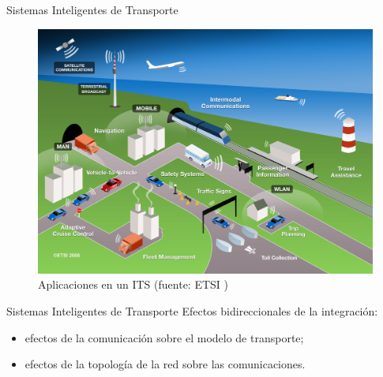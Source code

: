 \documentclass[aspectratio=169]{beamer}
\begin{document}
\begin{frame}{Sistemas Inteligentes de Transporte}
\begin{figure}
    \centering
    \includegraphics[height=0.8\textheight]{figuras/ITS.png}
    \caption{Aplicaciones en un ITS (fuente: ETSI \autocite{etsi})}
    \label{fig:itsetsi}
\end{figure}
\end{frame}

\begin{frame}{Sistemas Inteligentes de Transporte}
Efectos bidireccionales de la integración:\pause
\begin{itemize}
    \item efectos de la comunicación sobre el modelo de transporte;\pause
    \item efectos de la topología de la red sobre las comunicaciones.
\end{itemize}
\end{frame}
\end{document}
